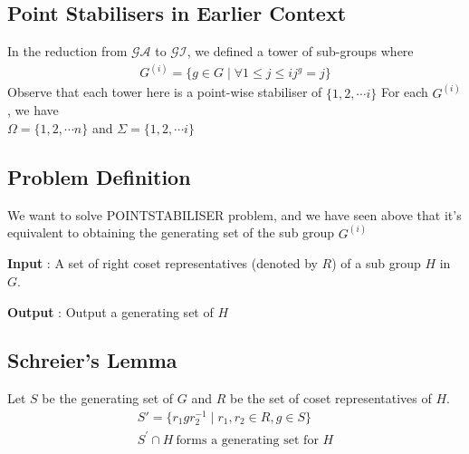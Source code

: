 \subsection{Point Stabilisers in Earlier Context}
In the reduction from $\mathcal{GA}$ to $\mathcal{GI}$, we defined
a tower of sub-groups  where
\begin{align}
G^{(i)} = \lbrace g \in G \mid \forall 1 \leq j \leq i j^g = j \rbrace 
\end{align}
Observe that each tower here is a point-wise stabiliser of $\lbrace 1, 2, \cdots i \rbrace$
For each $G^{(i)}$, we have \\
$\Omega = \lbrace 1, 2, \cdots n \rbrace$  and $\Sigma = \lbrace 1, 2, \cdots i \rbrace$ 

\subsection{Problem Definition}
We want to solve POINTSTABILISER problem, and we have
seen above that it's equivalent to obtaining the
generating set of the sub group $G^{(i)}$

\textbf{Input} : A set of right coset representatives (denoted by $R$) 
of a sub group $H$ in $G$. 

\textbf{Output} : Output a generating set of $H$

\subsection{Schreier's Lemma}
Let $S$ be the generating set of $G$ and $R$ be 
the set of coset representatives of $H$.
\begin{align}
S' = \lbrace r_1 g r_2^{-1} \mid r_1, r_2 \in R, g \in S \rbrace \\
S^\prime \cap H ~\text{forms a generating set for $H$}
\end{align}

